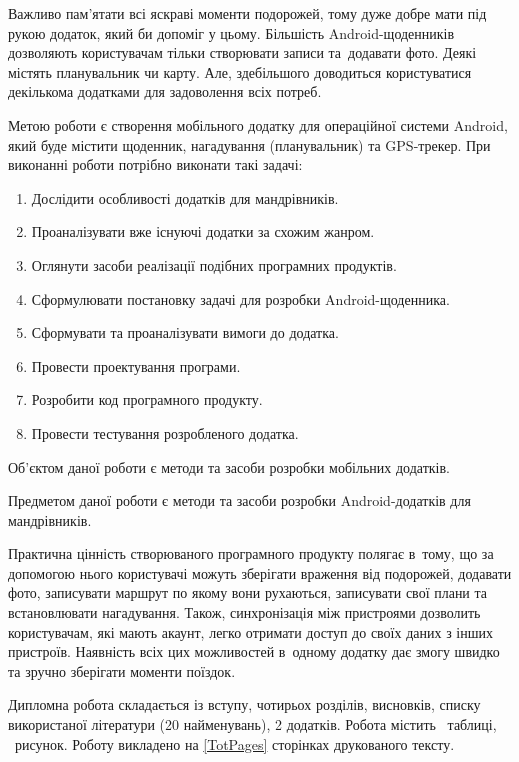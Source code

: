 \documentclass[../main.tex]{subfiles}
\begin{document}
Важливо пам'ятати всі яскраві моменти подорожей, тому дуже добре мати під рукою додаток, який би допоміг у цьому. Більшість Android-щоденників дозволяють користувачам тільки створювати записи та~додавати фото. Деякі містять планувальник чи карту. Але, здебільшого доводиться користуватися декількома додатками для задоволення всіх потреб.

Метою роботи є створення мобільного додатку для операційної системи Android, який буде містити щоденник, нагадування (планувальник) та \mbox{GPS-трекер}.
При виконанні роботи потрібно виконати такі задачі:
\begin{enumerate}
\item Дослідити особливості додатків для мандрівників.
\item Проаналізувати вже існуючі додатки за схожим жанром.
\item Оглянути засоби реалізації подібних програмних продуктів.
\item Сформулювати постановку задачі для розробки Android-щоденника.
\item Сформувати та проаналізувати вимоги до додатка.
\item Провести проектування програми.
\item Розробити код програмного продукту.
\item Провести тестування розробленого додатка.
\end{enumerate}

Об'єктом даної роботи є методи та засоби розробки мобільних додатків. 

Предметом даної роботи є методи та засоби розробки Android-додатків для мандрівників.

Практична цінність створюваного програмного продукту полягає в~тому, що за допомогою нього користувачі можуть зберігати враження від подорожей, додавати фото, записувати маршрут по якому вони рухаються, записувати свої плани та встановлювати нагадування. Також, синхронізація між пристроями дозволить користувачам, які мають акаунт, легко отримати доступ до своїх даних з інших пристроїв. Наявність всіх цих можливостей в~одному додатку дає змогу швидко та зручно зберігати моменти поїздок.

Дипломна робота складається із вступу, чотирьох розділів, висновків, списку використаної літератури (20 найменувань), 2 додатків. Робота містить \totaltables\ таблиці, \totalfigures\ рисунок. Роботу викладено на \ref{TotPages} сторінках друкованого тексту. 
\end{document}
